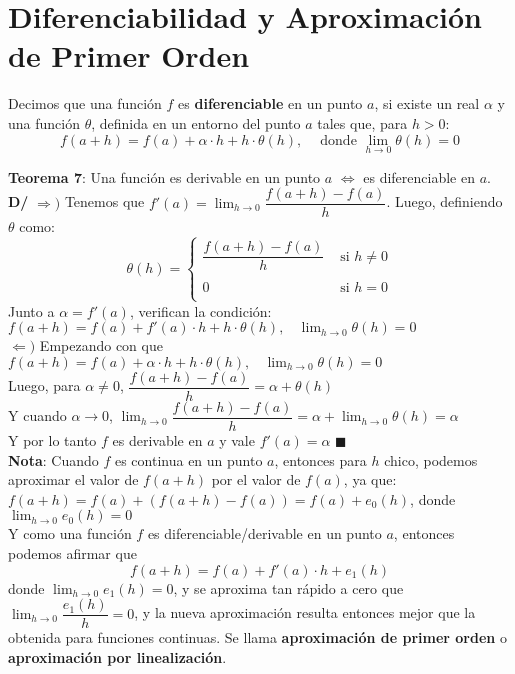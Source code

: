 \documentclass[11pt,a4paper]{article}
\newcommand*{\QEDA}{\null\nobreak\hfill\ensuremath{\blacksquare}}
\begin{document}
\section{Diferenciabilidad y Aproximaci\'on de Primer Orden}
Decimos que una funci\'on $f$ es \textbf{diferenciable} en un punto $a$, si existe un real $\alpha$ y una funci\'on $\theta$, definida en un entorno del punto $a$ tales que, para $h>0$: $$f(a+h) = f(a) + \alpha\cdot h + h \cdot \theta(h),\ \ \ \ \text{ donde } \displaystyle{\lim_{h \to 0} \theta(h) = 0}$$


\noindent \textbf{Teorema 7}: Una funci\'on es derivable en un punto $a$ $\iff$ es diferenciable en $a$.\\
\textbf{D/} 
$\Rightarrow)$ Tenemos que $f'(a)=\displaystyle{\lim_{h \to 0} \dfrac{f(a+h)-f(a)}{h}}$. Luego, definiendo $\theta$ como:
$$\theta(h) = \left\{ \begin{array}{cl}
\dfrac{f(a+h)-f(a)}{h} & \text{ si } h\not=0\\ \\
0 & \text{ si } h=0\\
\end{array}\right.$$
Junto a $\alpha = f'(a)$, verifican la condici\'on: $f(a+h)=f(a)+f'(a) \cdot h + h \cdot \theta(h),\ \ \ \ \displaystyle{\lim_{h \to 0} \theta(h) = 0}$\\
$\Leftarrow)$ Empezando con que $f(a+h) = f(a) + \alpha \cdot h + h \cdot \theta(h),\ \ \ \ \displaystyle{\lim_{h \to 0} \theta(h) = 0}$\\
Luego, para $\alpha \not = 0$, $\dfrac{f(a+h)-f(a)}{h} = \alpha + \theta(h)$\\

\noindent Y cuando $\alpha \to 0$, $\displaystyle{\lim_{h \to 0} \dfrac{f(a+h)-f(a)}{h} = \alpha + \lim_{h\to 0} \theta(h) = \alpha}$\\

\noindent Y por lo tanto $f$ es derivable en $a$ y vale $f'(a) = \alpha$ \QEDA\\

\noindent \textbf{Nota}: Cuando $f$ es continua en un punto $a$, entonces para $h$ chico, podemos aproximar el valor de $f(a+h)$ por el valor de $f(a)$, ya que: $f(a+h)=f(a)+(f(a+h)-f(a)) = f(a) + e_0(h)$, donde $\displaystyle{\lim_{h \to 0} e_0(h) = 0}$\\

\noindent Y como una funci\'on $f$ es diferenciable/derivable en un punto $a$, entonces podemos afirmar que $$f(a+h) = f(a)+f'(a)\cdot h + e_1(h)$$ donde $\displaystyle{\lim_{h \to 0} e_1(h) = 0}$, y se aproxima tan r\'apido a cero que $\displaystyle{\lim_{h \to 0} \dfrac{e_1(h)}{h} = 0}$, y la nueva aproximaci\'on resulta entonces mejor que la obtenida para funciones continuas. Se llama \textbf{aproximaci\'on de primer orden} o \textbf{aproximaci\'on por linealizaci\'on}.\\
\end{document}
